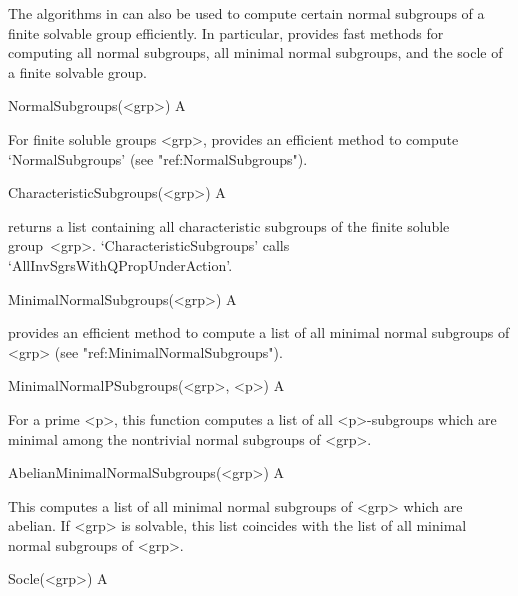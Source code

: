 
The algorithms in {\CRISP} can also be used to compute certain normal subgroups of a finite solvable
group efficiently. In particular, {\CRISP} provides fast methods for computing all normal subgroups, all minimal normal subgroups, and the socle of a finite solvable group. 


\null

\>NormalSubgroups(<grp>) A

For finite soluble groups <grp>, {\CRISP} provides an efficient method to compute `NormalSubgroups' (see "ref:NormalSubgroups"). 

\>CharacteristicSubgroups(<grp>) A

returns a list containing all characteristic subgroups of the finite soluble group~<grp>. 
`CharacteristicSubgroups' calls `AllInvSgrsWithQPropUnderAction'.

\>MinimalNormalSubgroups(<grp>) A

\relax
{\CRISP} provides an efficient method to compute a list of all minimal normal subgroups of <grp> (see "ref:MinimalNormalSubgroups"). 


\>MinimalNormalPSubgroups(<grp>, <p>) A

\relax
For a prime <p>, this function computes a list of all <p>-subgroups which are minimal among the nontrivial
normal subgroups of <grp>. 

\>AbelianMinimalNormalSubgroups(<grp>) A

\relax
This computes a list of all minimal normal subgroups of <grp> which are abelian. If <grp> is solvable, this list coincides with the list of all 
minimal normal subgroups of <grp>.

\null

\>Socle(<grp>) A

